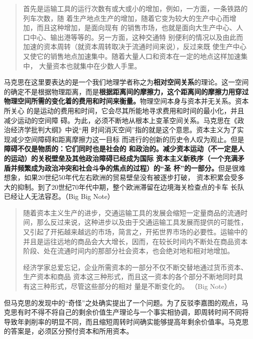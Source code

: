 \begin{quotation}
  首先是运输工具的运行次数有或大或小的增加，例如，一方面，一条铁路的列车次数，随
  着生产地点生产的增加，随着它变为较大的生产中心而增加，而且这种增加，是面向现有
  的销售市场，也就是面向大生产中心、人口中心、输出港等等的。另一方面，这种交通特
  别便利的情况以及由此而加速的资本周转（就资本周转取决于流通时间来说），反过来既
  使生产中心又使它的销售地点加速集中。随着大量人口和资本在一定的地点这样加速集中，
  大量资本也就集中在少数人手里。 

\end{quotation}

马克思在这里要表达的是一个我们地理学者称之为\textbf{相对空间关系}的理论。这一空间
的确定不是根据物理距离，而是\textbf{根据距离间的摩擦力，这个距离间的摩擦力用穿过
  物理空间所需的变化着的费用和时间来衡量。}物理空间本身与资本并无关系。资本所关心
的是运动的费用和时间，它会尽其所能地寻求费用和时间的最小化，并且减少运动的空间障
碍。为此，必须不断地从根本上变革空间关系。马克思在《政治经济学批判大纲》中说“用
时间消灭空间”指的就是这个意思。资本主义为了实现减少空间障碍和距离摩擦力这一目标
而进行的创新的历史令人叹为观止。但是\textbf{障碍不仅是物质的：它们同时也是社会的
  和政治的。减少资本运动（不一定是人的运动）的关税壁垒及其他政治障碍已经成为国际
  资本主义新秩序（一个充满矛盾并频繁成为政治冲突和社会斗争的焦点的过程）的“圣
  杯”的一部分。}但是很难想象，如果20世纪50年代左右欧洲的贸易壁垒没有被逐步打破，
资本积累会受多大的抑制。到了20世纪70年代中期，整个欧洲滞留在边境海关检查点的卡车
长队已经让人无法容忍。（Big Big Note）

\begin{quotation}
随着资本主义生产的进步，交通运输工具的发展会缩短一定量商品的流通时间，那么反过来说，这种进步以及由于交通运输工具发展而提供的可能性，又引起了开拓越来越远的市场，简言之，开拓世界市场的必要性。运输中的并且是运往远地的商品会大大增长，因而，在较长时间内不断处在商品资本阶段、处在流通时间内的那部分社会资本，也会绝对地和相对地增加。 

经济学家总爱忘记，企业所需资本的一部分不仅不断交替地通过货币资本、生产资本和商品
资本这三种形式，而且这一资本的各个部分不断地同时具有这三种形式，尽管这些部分的相对
量是不断变化的。 
（Big Note）


\end{quotation}


但马克思的发现中的“奇怪”之处确实提出了一个问题。为了反驳李嘉图的观点，马克思有时不得不将自己的剩余价值生产理论与一个事实相协调，即周转时间不同将导致年剥削率的明显不同，而且缩短周转时间确实能够提高年剩余价值率。马克思的答案是，必须区分预付资本和所用资本。


